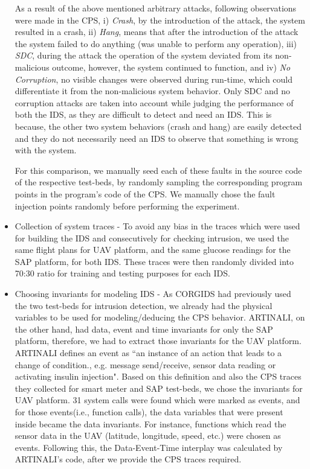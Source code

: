 \begin{itemize}
As a result of the above mentioned arbitrary attacks, following observations were made in the \ac{CPS}, i) \textit{Crash}, by the introduction of the attack, the system resulted in a crash, ii) \textit{Hang}, means that after the introduction of the attack the system failed to do anything (was unable to perform any operation), iii) \textit{\ac{SDC}}, during the attack the operation of the system deviated from its non-malicious outcome, however, the system continued to function, and iv) \textit{No Corruption}, no visible changes were observed during run-time, which could differentiate it from the non-malicious system behavior. Only \ac{SDC} and no corruption attacks are taken into account while judging the performance of both the \ac{IDS}, as they are difficult to detect and need an \ac{IDS}. This is because, the other two system behaviors (crash and hang) are easily detected and they do not necessarily need an \ac{IDS} to observe that something is wrong with the system. 

For this comparison, we manually seed each of these faults in the source code of the respective test-beds, by randomly sampling the corresponding program points in the program’s code of the \ac{CPS}. We manually chose the fault injection points randomly before performing the experiment.

\item Collection of system traces - To avoid any bias in the traces which were used for building the \ac{IDS} and consecutively for checking intrusion, we used the same flight plans for \ac{UAV} platform, and the same glucose readings for the \ac{SAP} platform, for both \ac{IDS}. These traces were then randomly divided into 70:30 ratio for training and testing purposes for each \ac{IDS}.

\item Choosing invariants for modeling \ac{IDS} - As \ac{CORGIDS} had previously used the two test-beds for intrusion detection, we already had the physical variables to be used for modeling/deducing the \ac{CPS} behavior. ARTINALI, on the other hand, had data, event and time invariants for only the \ac{SAP} platform, therefore, we had to extract those invariants for the \ac{UAV} platform. ARTINALI defines an event as ``an instance of an action that leads to a change of condition., e.g. message send/receive, sensor data reading or activating insulin injection". Based on this definition and also the \ac{CPS} traces they collected for smart meter and \ac{SAP} test-beds, we chose the invariants for \ac{UAV} platform. 31 system calls were found which were marked as events, and for those events(i.e., function calls), the data variables that were present inside became the data invariants. For instance, functions which read the sensor data in the \ac{UAV} (latitude, longitude, speed, etc.) were chosen as events. Following this, the Data-Event-Time interplay was calculated by ARTINALI's code\cite{ARTINALI}, after we provide the \ac{CPS} traces required.
\end{itemize}

